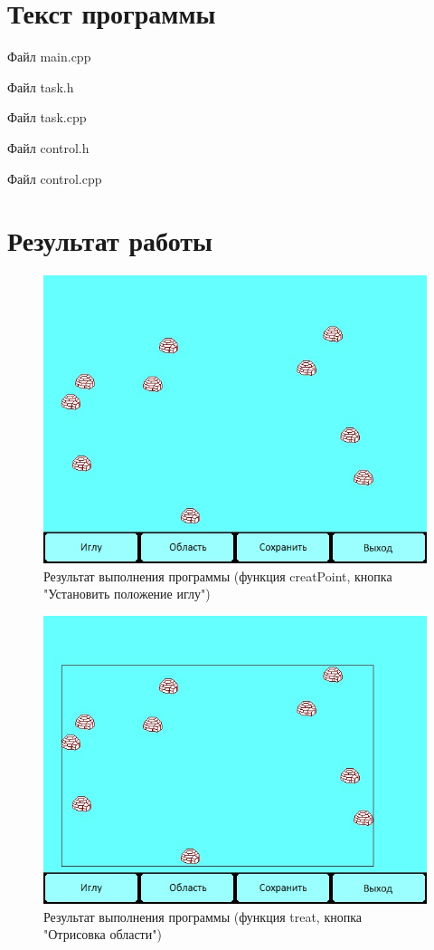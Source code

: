 \documentclass[14pt, a4paper]{extreport}
\begin{document}
\chapter{Текст программы}

\noindent Файл main.cpp

\pagebreak
\hrulefill

\noindent Файл task.h

\hrulefill

\noindent Файл task.cpp

\hrulefill

\noindent Файл control.h

\hrulefill

\noindent Файл control.cpp


\chapter{Результат работы}

\begin{figure}[h!]
	\centering
	\includegraphics[width = 12cm]{image/image_1}
  \caption{Результат выполнения программы (функция creatPoint, кнопка "Установить положение иглу")}
\end{figure}

\begin{figure}[h!]
	\centering
	\includegraphics[width = 12cm]{image/image_2}
  \caption{Результат выполнения программы (функция treat, кнопка "Отрисовка области")}
\end{figure}

\end{document}

